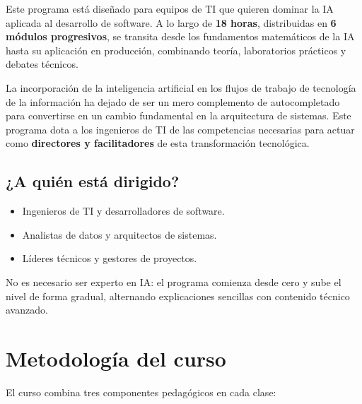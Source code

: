 \documentclass[11pt,a4paper]{article}
\begin{document}
\begin{cajaobjetivo}
Este programa está diseñado para equipos de TI que quieren dominar la IA aplicada al desarrollo de software. A lo largo de \textbf{18 horas}, distribuidas en \textbf{6 módulos progresivos}, se transita desde los fundamentos matemáticos de la IA hasta su aplicación en producción, combinando teoría, laboratorios prácticos y debates técnicos.
\end{cajaobjetivo}

La incorporación de la inteligencia artificial en los flujos de trabajo de tecnología de la información ha dejado de ser un mero complemento de autocompletado para convertirse en un cambio fundamental en la arquitectura de sistemas. Este programa dota a los ingenieros de TI de las competencias necesarias para actuar como \textbf{directores y facilitadores} de esta transformación tecnológica.

\subsection{¿A quién está dirigido?}

\begin{itemize}
  \item Ingenieros de TI y desarrolladores de software.
  \item Analistas de datos y arquitectos de sistemas.
  \item Líderes técnicos y gestores de proyectos.
\end{itemize}

\begin{cajanota}
No es necesario ser experto en IA: el programa comienza desde cero y sube el nivel de forma gradual, alternando explicaciones sencillas con contenido técnico avanzado.
\end{cajanota}

\section{Metodología del curso}

El curso combina tres componentes pedagógicos en cada clase:
\end{document}
